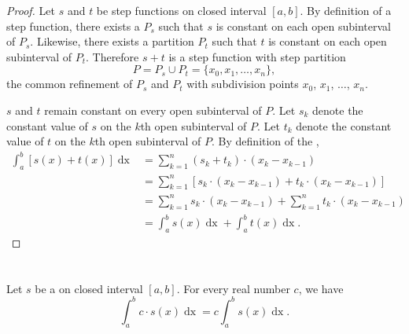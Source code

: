 \documentclass{report}
\begin{document}
\begin{proof}

  Let $s$ and $t$ be step functions on closed interval $[a, b]$.
  By definition of a step function, there exists a 
    $P_s$ such that $s$ is constant on each open subinterval of $P_s$.
  Likewise, there exists a partition $P_t$ such that $t$ is constant on each
    open subinterval of $P_t$.
  Therefore $s + t$ is a step function with step partition
    $$P = P_s \cup P_t = \{x_0, x_1, \ldots, x_n\},$$ the common refinement of
    $P_s$ and $P_t$ with subdivision points $x_0$, $x_1$, $\ldots$, $x_n$.

  $s$ and $t$ remain constant on every open subinterval of $P$.
  Let $s_k$ denote the constant value of $s$ on the $k$th open subinterval of
    $P$.
  Let $t_k$ denote the constant value of $t$ on the $k$th open subinterval of
    $P$.
  By definition of the ,
    \begin{align*}
      \int_a^b \left[ s(x) + t(x) \right] \mathop{dx}
        & = \sum_{k=1}^n (s_k + t_k) \cdot (x_k - x_{k-1}) \\
        & = \sum_{k=1}^n \left[ s_k \cdot (x_k - x_{k-1}) +
                                t_k \cdot (x_k - x_{k-1}) \right] \\
        & = \sum_{k=1}^n s_k \cdot (x_k - x_{k-1}) +
            \sum_{k=1}^n t_k \cdot (x_k - x_{k-1}) \\
        & = \int_a^b s(x) \mathop{dx} + \int_a^b t(x) \mathop{dx}.
    \end{align*}

\end{proof}

\section{}%
\label{sec:step-homogeneous-property}
\label{sec:theorem-1.3}

\begin{theorem}[1.3]

  Let $s$ be a  on closed interval $[a, b]$.
  For every real number $c$, we have
    $$\int_a^b c \cdot s(x) \mathop{dx} = c\int_a^b s(x) \mathop{dx}.$$

\end{theorem}
\end{document}
